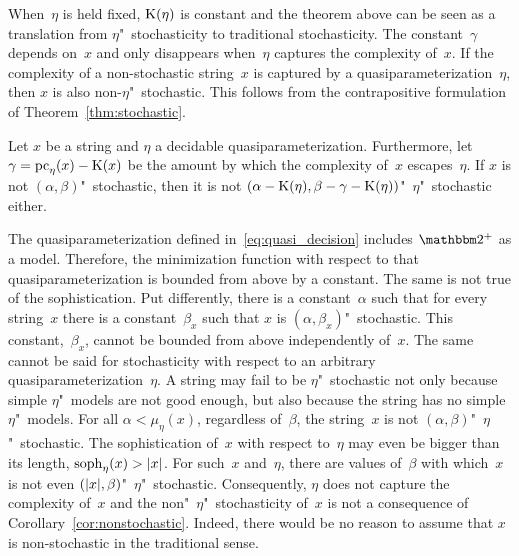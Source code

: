 When~$\eta$ is held fixed, $\operatorname{K}(\eta)$ is constant and the theorem above can be seen as a translation from $\eta$"~stochasticity to traditional stochasticity.
The constant~$\gamma$ depends on~$x$ and only disappears when~$\eta$ captures the complexity of~$x$.
If the complexity of a non-stochastic string~$x$ is captured by a quasiparameterization~$\eta$, then $x$ is also non-$\eta$"~stochastic.
This follows from the contrapositive formulation of Theorem~\ref{thm:stochastic}.
\begin{corollary}
\label{cor:nonstochastic}%
  Let $x$ be a string and $\eta$ a decidable quasiparameterization.
  Furthermore, let $\gamma = \operatorname{pc}_\eta(x) - \operatorname{K}(x)$ be the amount by which the complexity of~$x$ escapes~$\eta$.
  If $x$ is not $(\alpha, \beta)$"~stochastic, then it is not $(\alpha - \operatorname{K}(\eta), \beta - \gamma - \operatorname{K}(\eta))$"~$\eta$"~stochastic either.
\end{corollary}

The quasiparameterization defined in~\eqref{eq:quasi_decision} includes $\binary^+$ as a model.
Therefore, the minimization function with respect to that quasiparameterization is bounded from above by a constant.
The same is not true of the sophistication.
Put differently, there is a constant~$\alpha$ such that for every string~$x$ there is a constant~$\beta_x$ such that $x$ is $(\alpha, \beta_x)$"~stochastic.
This constant,~$\beta_x$, cannot be bounded from above independently of~$x$.
The same cannot be said for stochasticity with respect to an arbitrary quasiparameterization~$\eta$.
A string may fail to be $\eta$"~stochastic not only because simple $\eta$"~models are not good enough, but also because the string has no simple $\eta$"~models.
For all $\alpha < \mu_\eta(x)$, regardless of~$\beta$, the string~$x$ is not $(\alpha, \beta)$"~$\eta$"~stochastic.
The sophistication of~$x$ with respect to~$\eta$ may even be bigger than its length, $\operatorname{soph}_\eta(x) > {\lvert x\rvert}$.
For such~$x$ and~$\eta$, there are values of~$\beta$ with which~$x$ is not even $({\lvert x\rvert}, \beta)$"~$\eta$"~stochastic.
Consequently, $\eta$ does not capture the complexity of~$x$ and the non"~$\eta$"~stochasticity of~$x$ is not a consequence of Corollary~\ref{cor:nonstochastic}.
Indeed, there would be no reason to assume that $x$ is non-stochastic in the traditional sense.

